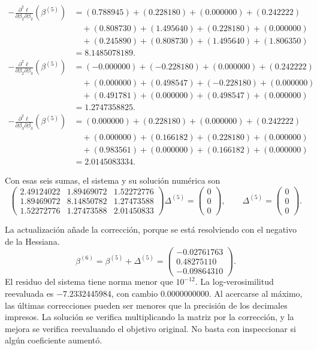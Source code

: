 \documentclass[11pt,a4paper]{article}
\begin{document}
\[
\begin{aligned}
-\frac{\partial^2\ell}{\partial\beta_2\partial\beta_2}(\beta^{(5)})&=(0.788945)+(0.228180)+(0.000000)+(0.242222)\\&\quad+(0.808730)+(1.495640)+(0.228180)+(0.000000)\\&\quad+(0.245890)+(0.808730)+(1.495640)+(1.806350)\\&=8.1485078189.\end{aligned}
\]
\[
\begin{aligned}
-\frac{\partial^2\ell}{\partial\beta_2\partial\beta_3}(\beta^{(5)})&=(-0.000000)+(-0.228180)+(0.000000)+(0.242222)\\&\quad+(0.000000)+(0.498547)+(-0.228180)+(0.000000)\\&\quad+(0.491781)+(0.000000)+(0.498547)+(0.000000)\\&=1.2747358825.\end{aligned}
\]
\[
\begin{aligned}
-\frac{\partial^2\ell}{\partial\beta_3\partial\beta_3}(\beta^{(5)})&=(0.000000)+(0.228180)+(0.000000)+(0.242222)\\&\quad+(0.000000)+(0.166182)+(0.228180)+(0.000000)\\&\quad+(0.983561)+(0.000000)+(0.166182)+(0.000000)\\&=2.0145083334.\end{aligned}
\]

Con esas seis sumas, el sistema y su solución numérica son
\[
\begin{pmatrix}2.49124022&1.89469072&1.52272776\\1.89469072&8.14850782&1.27473588\\1.52272776&1.27473588&2.01450833\end{pmatrix}\Delta^{(5)}=\begin{pmatrix}0\\0\\0\end{pmatrix},\qquad\Delta^{(5)}=\begin{pmatrix}0\\0\\0\end{pmatrix}.
\]

La actualización añade la corrección, porque se está resolviendo
con el negativo de la Hessiana.
\[
\beta^{(6)}=\beta^{(5)}+\Delta^{(5)}=\begin{pmatrix}-0.02761763\\0.48275110\\-0.09864310\end{pmatrix}.
\]
El residuo del sistema tiene norma menor que \(10^{-12}\). La log-verosimilitud reevaluada es \(-7.2332445984\), con cambio \(0.0000000000\). 
Al acercarse al máximo, las últimas correcciones pueden ser
menores que la precisión de los decimales impresos.
La solución se verifica multiplicando la matriz por la corrección,
y la mejora se verifica reevaluando el objetivo original.
No basta con inspeccionar si algún coeficiente aumentó.
\endgroup
\end{document}
